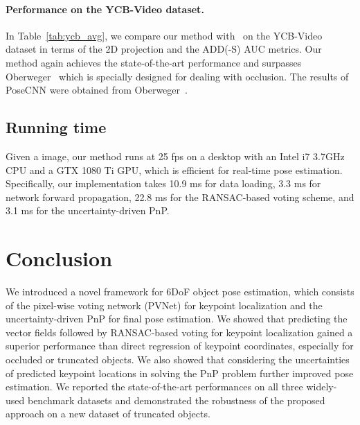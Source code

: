 \documentclass[10pt,twocolumn,letterpaper]{article}
\begin{document}
\paragraph{Performance on the YCB-Video dataset.} In Table~\ref{tab:ycb_avg}, we compare our method with~\cite{ xiang2017posecnn, oberweger2018making} on the YCB-Video dataset in terms of the 2D projection and the ADD(-S) AUC metrics. Our method again achieves the state-of-the-art performance and surpasses Oberweger~\cite{oberweger2018making} which is specially designed for dealing with occlusion. The results of PoseCNN were obtained from Oberweger~\cite{oberweger2018making}.

\begin{table}
\begin{center}
 \end{center}
\vspace{-0.2mm}
\caption{The accuracies of our method and the baseline methods on the YCB-Video dataset in terms of the \textbf{2D projection} and the \textbf{ADD(-S) AUC} metrics.}
\label{tab:ycb_avg}
\vspace{-2mm}
\end{table} 
\subsection{Running time}

Given a  image, our method runs at 25 fps on a desktop with an Intel i7 3.7GHz CPU and a GTX 1080 Ti GPU, which is efficient for real-time pose estimation. Specifically, our implementation takes 10.9 ms for data loading, 3.3 ms for network forward propagation, 22.8 ms for the RANSAC-based voting scheme, and 3.1 ms for the uncertainty-driven PnP.
 \section{Conclusion}

We introduced a novel framework for 6DoF object pose estimation, which consists of the pixel-wise voting network (PVNet) for keypoint localization and the uncertainty-driven PnP for final pose estimation. We showed that predicting the vector fields followed by RANSAC-based voting for keypoint localization gained a superior performance than direct regression of keypoint coordinates, especially for occluded or truncated objects. We also showed that considering the uncertainties of predicted keypoint locations in solving the PnP problem further improved pose estimation. We reported the state-of-the-art performances on all three widely-used benchmark datasets and demonstrated the robustness of the proposed approach on a new dataset of truncated objects. 
 
{\small


}
\end{document}
